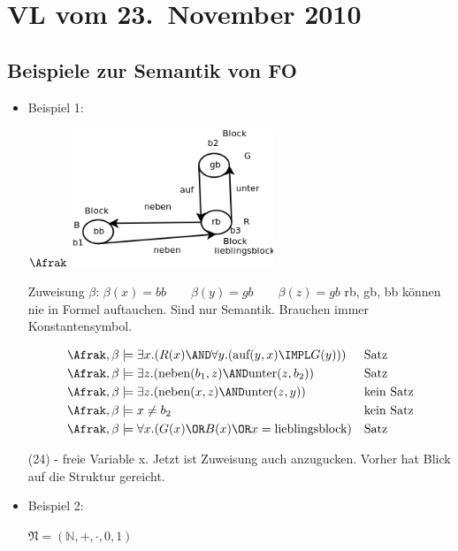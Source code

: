 \section{VL vom 23.~November 2010}

\subsection{Beispiele zur Semantik von FO}

\begin{itemize}
  \item Beispiel 1:\par
  $\Afrak$ \includegraphics[width=6cm]{23_11_10_1.png}
  
  Zuweisung $\beta$: $\beta(x) = bb \qquad \beta(y) = gb \qquad \beta(z) = gb$
  rb, gb, bb können nie in Formel auftauchen. Sind nur Semantik. Brauchen immer Konstantensymbol.

  \begin{align}
    \Afrak, \beta &\models \exists x.(R(x) \AND \forall y.(\text{auf}(y,x) \IMPL G(y))) && \text{Satz} \\
    \Afrak, \beta &\models \exists z.(\text{neben}(b_1,z) \AND \text{unter}(z,b_2))     && \text{Satz} \\
    \Afrak, \beta &\models \exists z.(\text{neben}(x,z) \AND \text{unter}(z,y))         && \text{kein Satz} \\
    \Afrak, \beta &\models x \not= b_2                                                  && \text{kein Satz} \\
    \Afrak, \beta &\models \forall x.(G(x) \OR B(x) \OR x = \text{lieblingsblock})      && \text{Satz}
  \end{align}
  
(24) - freie Variable x. Jetzt ist Zuweisung auch anzugucken. Vorher hat Blick auf die Struktur gereicht.

  \item Beispiel 2:\par
  $\mathfrak{N} = (\mathbb{N}, +, \cdot, 0, 1)$
  

\end{itemize}
